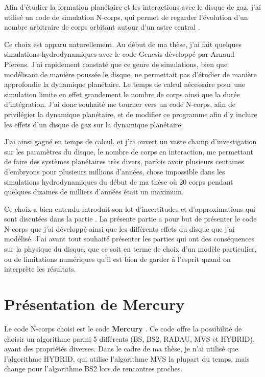 Afin d'étudier la formation planétaire et les interactions avec le disque de gaz, j'ai utilisé un code de simulation N-corps, qui permet de regarder l'évolution d'un nombre arbitraire de corps orbitant autour d'un astre central \citep{chambers1999hybrid}. 

Ce choix est apparu naturellement. Au début de ma thèse, j'ai fait quelques simulations hydrodynamiques avec le code Genesis développé par Arnaud Pierens. J'ai rapidement constaté que ce genre de simulations, bien que modélisant de manière poussée le disque, ne permettait pas d'étudier de manière approfondie la dynamique planétaire. Le temps de calcul nécessaire pour une simulation limite en effet grandement le nombre de corps ainsi que la durée d'intégration. J'ai donc souhaité me tourner vers un code N-corps, afin de privilégier la dynamique planétaire, et de modifier ce programme afin d'y inclure les effets d'un disque de gaz sur la dynamique planétaire. 

J'ai ainsi gagné en temps de calcul, et j'ai ouvert un vaste champ d'investigation sur les paramètres du disque, le nombre de corps en interaction, me permettant de faire des systèmes planétaires très divers, parfois avoir plusieurs centaines d'embryons pour plusieurs millions d'années, chose impossible dans les simulations hydrodynamiques du début de ma thèse où 20 corps pendant quelques dizaines de milliers d'années était un maximum. 

Ce choix a bien entendu introduit son lot d'incertitudes et d'approximations qui sont discutées dans la partie . La présente partie a pour but de présenter le code N-corps que j'ai développé ainsi que les différents effets du disque que j'ai modélisé. J'ai avant tout souhaité présenter les parties qui ont des conséquences sur la physique du disque, que ce soit en terme de choix d'un modèle particulier, ou de limitations numériques qu'il est bien de garder à l'esprit quand on interprète les résultats.

\section{Présentation de Mercury}
Le code N-corps choisi est le code \textbf{Mercury} \citep{chambers1999hybrid}. Ce code offre la possibilité de choisir un algorithme parmi 5 différents (BS, BS2, RADAU, MVS et HYBRID), ayant des propriétés diverses. Dans le cadre de ma thèse, je n'ai utilisé que l'algorithme HYBRID, qui utilise l'algorithme MVS la plupart du temps, mais change pour l'algorithme BS2 lors de rencontres proches. 

